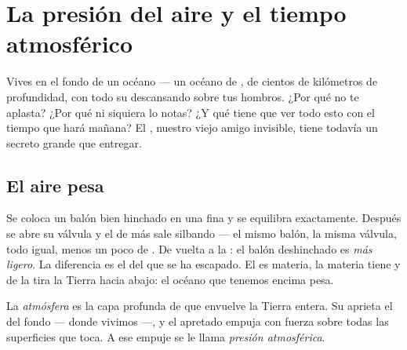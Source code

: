 \chapter{La presión del aire y el tiempo atmosférico}\label{ch:g5:air-pressure-weather}

Vives en el fondo de un océano --- un océano de , de cientos de
kilómetros de profundidad, con todo su  descansando sobre tus
hombros. ¿Por qué no te aplasta? ¿Por qué ni siquiera lo notas? ¿Y qué
tiene que ver todo esto con el tiempo que hará mañana? El ,
nuestro viejo amigo invisible, tiene todavía un secreto grande que
entregar.

\section{El aire pesa}

\begin{example}\label{ex:g5:air-pressure-weather:weighing}
Se coloca un balón bien hinchado en una  fina y se equilibra
exactamente. Después se abre su válvula y el  de más sale
silbando --- el mismo balón, la misma válvula, todo igual, menos un
poco de . De vuelta a la : el balón deshinchado es
\emph{más ligero}. La diferencia es el  del  que se ha
escapado. El  es materia, la materia tiene  y de la
 tira la Tierra hacia abajo: el océano que tenemos encima pesa.
\end{example}

\begin{definition}\label{def:g5:air-pressure-weather:pressure}
La \emph{atmósfera} es la capa profunda de 
que envuelve la Tierra entera. Su  aprieta el  del fondo
--- donde vivimos ---, y el  apretado empuja con fuerza sobre
todas las superficies que toca. A ese empuje se le llama \emph{presión
atmosférica}.
\end{definition}

